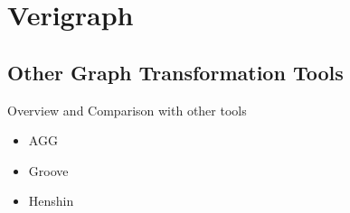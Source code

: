 \chapter{Verigraph}
 
\section{Other Graph Transformation Tools}

Overview and Comparison with other tools

\begin{itemize}
\item AGG
\item Groove
\item Henshin
\end{itemize}
